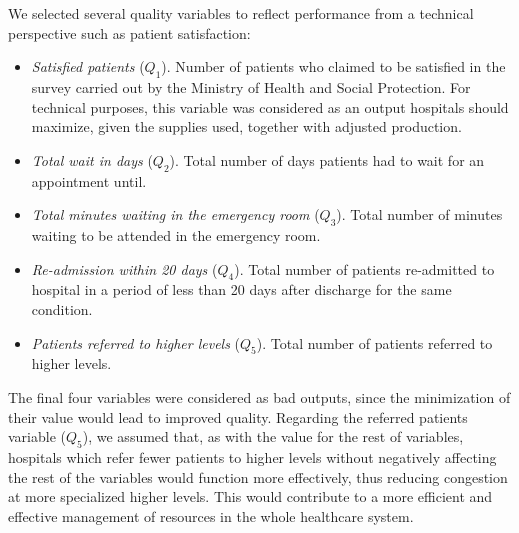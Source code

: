 \documentclass[11pt,a4paper,oneside]{article}
\begin{document}
We selected several quality variables to reflect performance from a technical perspective such as patient satisfaction:
%
\begin{itemize}[leftmargin=2cm]

\item \textit{Satisfied patients} ($Q_1$). Number of patients who claimed to be satisfied in the survey carried out by the Ministry of Health and Social Protection. For technical purposes, this variable was considered as an output hospitals should maximize, given the supplies used, together with adjusted production. 

\item \textit{Total wait in days} ($Q_2$). Total number of days patients had to wait for an appointment until. 

\item \textit{Total minutes waiting in the emergency room} ($Q_3$). Total number of minutes waiting to be attended in the emergency room. 

\item \textit{Re-admission within 20 days} ($Q_4$). Total number of patients re-admitted to hospital in a period of less than 20 days after discharge for the same condition.

\item \textit{Patients referred to higher levels} ($Q_5$). Total number of patients referred to higher levels. 
\end{itemize}


The final four variables were considered as bad outputs, since the minimization of their value would lead to improved quality. Regarding the referred patients variable ($Q_5$), we assumed that, as with the value for the rest of variables, hospitals which refer fewer patients to higher levels without negatively affecting the rest of the variables would function more effectively, thus reducing congestion at more specialized higher levels. This would contribute to a more efficient and effective management of resources in the whole healthcare system.
\end{document}
